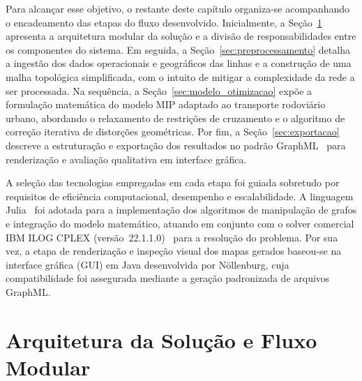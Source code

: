 \documentclass[cic,tc]{infufrgs}
\begin{document}
Para alcançar esse objetivo, o restante deste capítulo organiza-se acompanhando o encadeamento das etapas do fluxo desenvolvido. Inicialmente, a Seção~\ref{sec:arquitetura} apresenta a arquitetura modular da solução e a divisão de responsabilidades entre os componentes do sistema. Em seguida, a Seção~\ref{sec:preprocessamento} detalha a ingestão dos dados operacionais e geográficos das linhas e a construção de uma malha topológica simplificada, com o intuito de mitigar a complexidade da rede a ser processada. Na sequência, a Seção~\ref{sec:modelo_otimizacao} expõe a formulação matemática do modelo MIP adaptado ao transporte rodoviário urbano, abordando o relaxamento de restrições de cruzamento e o algoritmo de correção iterativa de distorções geométricas. Por fim, a Seção~\ref{sec:exportacao} descreve a estruturação e exportação dos resultados no padrão GraphML~\cite{brandes2010graph} para renderização e avaliação qualitativa em interface gráfica.

A seleção das tecnologias empregadas em cada etapa foi guiada sobretudo por requisitos de eficiência computacional, desempenho e escalabilidade. A linguagem Julia~\cite{bezanson2017julia} foi adotada para a implementação dos algoritmos de manipulação de grafos e integração do modelo matemático, atuando em conjunto com o solver comercial IBM ILOG CPLEX (versão~22.1.1.0)~\cite{cplex2022} para a resolução do problema. Por sua vez, a etapa de renderização e inspeção visual dos mapas gerados baseou-se na interface gráfica (GUI) em Java desenvolvida por Nöllenburg, cuja compatibilidade foi assegurada mediante a geração padronizada de arquivos GraphML.



\section{Arquitetura da Solução e Fluxo Modular}
\label{sec:arquitetura}
\end{document}
